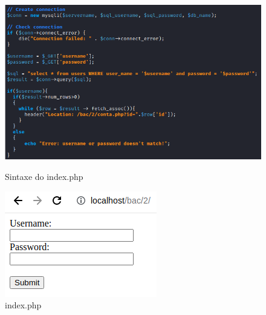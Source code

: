 \documentclass{report}
\begin{document}
\begin{figure}[!htb]
  \includegraphics[width=\linewidth]{imagescodebac/baccode1.png}
  \caption{Sintaxe do index.php}\label{fig:index.php}
\endminipage\hfill
{}
  \includegraphics[width=\linewidth]{imagesbac/bac1.png}
  \caption{index.php}\label{fig:intefacelogin}
\endminipage
\end{figure}
\end{document}
